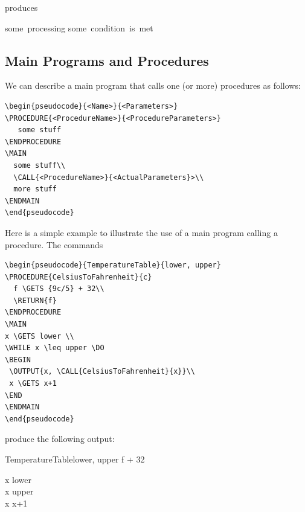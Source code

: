 \documentclass[a4]{article}
\begin{document}
\noindent{}produces

\medskip
\begin{pseudocode}[display]{}{}
\REPEAT
\mbox{some processing}
\UNTIL \mbox{some condition is met}
\end{pseudocode}

\subsection{Main Programs and Procedures}

We can describe a main program that calls one (or more) procedures as follows:

\begin{verbatim}
\begin{pseudocode}{<Name>}{<Parameters>}
\PROCEDURE{<ProcedureName>}{<ProcedureParameters>}
   some stuff
\ENDPROCEDURE
\MAIN
  some stuff\\
  \CALL{<ProcedureName>}{<ActualParameters}>\\
  more stuff
\ENDMAIN
\end{pseudocode}
\end{verbatim}

Here is a simple example to illustrate the 
use of a main program calling a procedure.
The commands

\begin{verbatim}
\begin{pseudocode}{TemperatureTable}{lower, upper}
\PROCEDURE{CelsiusToFahrenheit}{c}
  f \GETS {9c/5} + 32\\
  \RETURN{f}
\ENDPROCEDURE 
\MAIN
x \GETS lower \\
\WHILE x \leq upper \DO
\BEGIN
 \OUTPUT{x, \CALL{CelsiusToFahrenheit}{x}}\\
 x \GETS x+1
\END
\ENDMAIN
\end{pseudocode}
\end{verbatim}

\noindent{}produce the following output:

\begin{pseudocode}{TemperatureTable}{lower, upper}
  f  + 32\\
\ENDPROCEDURE 

\MAIN
x \GETS lower \\
\WHILE x \leq upper \DO
\BEGIN
 \\
 x \GETS x+1
\END
\ENDMAIN
\end{pseudocode}
\end{document}
